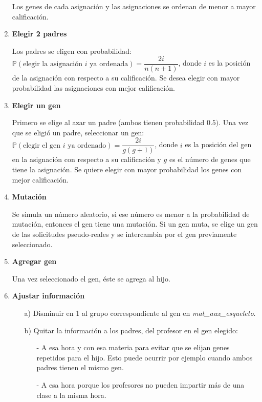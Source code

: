 \begin{enumerate}
Los genes de cada asignación y las asignaciones se ordenan de menor a mayor calificación.

\item \textbf{Elegir 2 padres} \label{paso_elegir_padres}

Los padres se eligen con probabilidad: $\mathbb{P}(\text{elegir la asignación } i \text{ ya ordenada}) = \dfrac{2i}{n(n+1)}$, donde $i$ es la posición de la asignación con respecto a su calificación. Se desea elegir con mayor probabilidad las asignaciones con mejor calificación.

\item \textbf{Elegir un gen} \label{paso_elegir_gen}

Primero se elige al azar un padre (ambos tienen probabilidad $0.5)$. Una vez que se eligió un padre, seleccionar un gen: $\mathbb{P}(\text{elegir el gen } i \text{ ya ordenado}) = \dfrac{2i}{g(g+1)}$, donde $i$ es la posición del gen en la asignación con respecto a su calificación y $g$ es el número de genes que tiene la asignación. Se quiere elegir con mayor probabilidad los genes con mejor calificación.

\item \textbf{Mutación}

Se simula un número aleatorio, si ese número es menor a la probabilidad de mutación, entonces el gen tiene una mutación. Si un gen muta, se elige un gen de las solicitudes pseudo-reales y se intercambia por el gen previamente seleccionado.

\item \textbf{Agregar gen}

Una vez seleccionado el gen, éste se agrega al hijo.

\item \textbf{Ajustar información} \label{paso_ajusta_info}

\begin{itemize}
\item[a)] Disminuir en 1 al grupo correspondiente al gen en \textit{mat\_aux\_esqueleto}.

\item[b)] Quitar la información a los padres, del profesor en el gen elegido:

\begin{itemize}
\item[-] A esa hora y con esa materia para evitar que se elijan genes repetidos para el hijo. Esto puede ocurrir por ejemplo cuando ambos padres tienen el mismo gen.

\item[-] A esa hora porque los profesores no pueden impartir más de una clase a la misma hora.


\end{itemize}
\end{itemize}
\end{enumerate}
